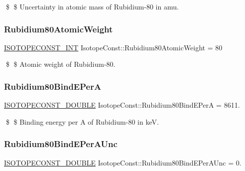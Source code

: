 \$ \$ Uncertainty in atomic mass of Rubidium-\/80 in amu. \mbox{\label{group___isotope_const-_rubidium-_rb80_ga19cea9e3c7a907ff05656c27151f1992}} 
\subsubsection{\texorpdfstring{Rubidium80\+Atomic\+Weight}{Rubidium80AtomicWeight}}
{\footnotesize\ttfamily \mbox{\hyperlink{group___isotope_const-_macros_ga5f18360b3e99483a35c32d789e62621c}{I\+S\+O\+T\+O\+P\+E\+C\+O\+N\+S\+T\+\_\+\+I\+NT}} Isotope\+Const\+::\+Rubidium80\+Atomic\+Weight = 80}

\$ \$ Atomic weight of Rubidium-\/80. \mbox{\label{group___isotope_const-_rubidium-_rb80_gaf5cd5c5e20f6e216db54cf96b3db2369}} 
\subsubsection{\texorpdfstring{Rubidium80\+Bind\+E\+PerA}{Rubidium80BindEPerA}}
{\footnotesize\ttfamily \mbox{\hyperlink{group___isotope_const-_macros_ga8f45a7272ce02c0b4c65c44636ed719a}{I\+S\+O\+T\+O\+P\+E\+C\+O\+N\+S\+T\+\_\+\+D\+O\+U\+B\+LE}} Isotope\+Const\+::\+Rubidium80\+Bind\+E\+PerA = 8611.}

\$ \$ Binding energy per A of Rubidium-\/80 in keV. \mbox{\label{group___isotope_const-_rubidium-_rb80_gabc347cbfd197b2507dc8e45477cd0ec3}} 
\subsubsection{\texorpdfstring{Rubidium80\+Bind\+E\+Per\+A\+Unc}{Rubidium80BindEPerAUnc}}
{\footnotesize\ttfamily \mbox{\hyperlink{group___isotope_const-_macros_ga8f45a7272ce02c0b4c65c44636ed719a}{I\+S\+O\+T\+O\+P\+E\+C\+O\+N\+S\+T\+\_\+\+D\+O\+U\+B\+LE}} Isotope\+Const\+::\+Rubidium80\+Bind\+E\+Per\+A\+Unc = 0.}

